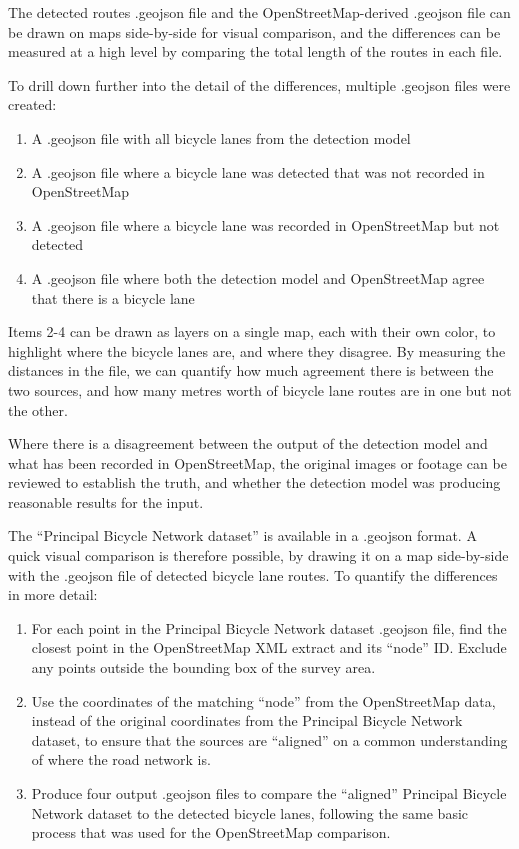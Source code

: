 \documentclass[11pt,twoside]{report}
\begin{document}
The detected routes .geojson file and the OpenStreetMap-derived .geojson file can be drawn on maps side-by-side for visual comparison, and the differences can be measured at a high level by comparing the total length of the routes in each file.

To drill down further into the detail of the differences, multiple .geojson files were created:

\begin{enumerate}
\item{A .geojson file with all bicycle lanes from the detection model}
\item{A .geojson file where a bicycle lane was detected that was not recorded in OpenStreetMap}
\item{A .geojson file where a bicycle lane was recorded in OpenStreetMap but not detected}
\item{A .geojson file where both the detection model and OpenStreetMap agree that there is a bicycle lane}	
\end{enumerate}

Items 2-4 can be drawn as layers on a single map, each with their own color, to highlight where the bicycle lanes are, and where they disagree.  By measuring the distances in the file, we can quantify how much agreement there is between the two sources, and how many metres worth of bicycle lane routes are in one but not the other.

Where there is a disagreement between the output of the detection model and what has been recorded in OpenStreetMap, the original images or footage can be reviewed to establish the truth, and whether the detection model was producing reasonable results for the input.

The ``Principal Bicycle Network dataset'' is available in a .geojson format.  A quick visual comparison is therefore possible, by drawing it on a map side-by-side with the .geojson file of detected bicycle lane routes.  To quantify the differences in more detail:

\begin{enumerate}
\item{For each point in the Principal Bicycle Network dataset .geojson file, find the closest point in the OpenStreetMap XML extract and its ``node'' ID.  Exclude any points outside the bounding box of the survey area.}
\item{Use the coordinates of the matching ``node'' from the OpenStreetMap data, instead of the original coordinates from the Principal Bicycle Network dataset, to ensure that the sources are ``aligned'' on a common understanding  of where the road network is.}
\item{Produce four output .geojson files to compare the ``aligned'' Principal Bicycle Network dataset to the detected bicycle lanes, following the same basic process that was used for the OpenStreetMap comparison.}
\end{enumerate}
\end{document}
